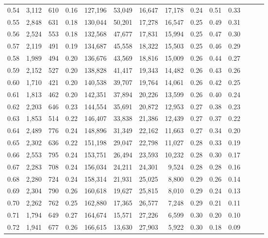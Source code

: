 \begin{tabular}{rrrrrrrrrrrrrr}
0.54 &  3,112 &  610 &  0.16 &  127,196 &   53,049 &  16,647 &  17,178 &  0.24 &  0.51 &      0.33 \\
0.55 &  2,848 &  631 &  0.18 &  130,044 &   50,201 &  17,278 &  16,547 &  0.25 &  0.49 &      0.31 \\
0.56 &  2,524 &  553 &  0.18 &  132,568 &   47,677 &  17,831 &  15,994 &  0.25 &  0.47 &      0.30 \\
0.57 &  2,119 &  491 &  0.19 &  134,687 &   45,558 &  18,322 &  15,503 &  0.25 &  0.46 &      0.29 \\
0.58 &  1,989 &  494 &  0.20 &  136,676 &   43,569 &  18,816 &  15,009 &  0.26 &  0.44 &      0.27 \\
0.59 &  2,152 &  527 &  0.20 &  138,828 &   41,417 &  19,343 &  14,482 &  0.26 &  0.43 &      0.26 \\
0.60 &  1,710 &  421 &  0.20 &  140,538 &   39,707 &  19,764 &  14,061 &  0.26 &  0.42 &      0.25 \\
0.61 &  1,813 &  462 &  0.20 &  142,351 &   37,894 &  20,226 &  13,599 &  0.26 &  0.40 &      0.24 \\
0.62 &  2,203 &  646 &  0.23 &  144,554 &   35,691 &  20,872 &  12,953 &  0.27 &  0.38 &      0.23 \\
0.63 &  1,853 &  514 &  0.22 &  146,407 &   33,838 &  21,386 &  12,439 &  0.27 &  0.37 &      0.22 \\
0.64 &  2,489 &  776 &  0.24 &  148,896 &   31,349 &  22,162 &  11,663 &  0.27 &  0.34 &      0.20 \\
0.65 &  2,302 &  636 &  0.22 &  151,198 &   29,047 &  22,798 &  11,027 &  0.28 &  0.33 &      0.19 \\
0.66 &  2,553 &  795 &  0.24 &  153,751 &   26,494 &  23,593 &  10,232 &  0.28 &  0.30 &      0.17 \\
0.67 &  2,283 &  708 &  0.24 &  156,034 &   24,211 &  24,301 &   9,524 &  0.28 &  0.28 &      0.16 \\
0.68 &  2,280 &  724 &  0.24 &  158,314 &   21,931 &  25,025 &   8,800 &  0.29 &  0.26 &      0.14 \\
0.69 &  2,304 &  790 &  0.26 &  160,618 &   19,627 &  25,815 &   8,010 &  0.29 &  0.24 &      0.13 \\
0.70 &  2,262 &  762 &  0.25 &  162,880 &   17,365 &  26,577 &   7,248 &  0.29 &  0.21 &      0.11 \\
0.71 &  1,794 &  649 &  0.27 &  164,674 &   15,571 &  27,226 &   6,599 &  0.30 &  0.20 &      0.10 \\
0.72 &  1,941 &  677 &  0.26 &  166,615 &   13,630 &  27,903 &   5,922 &  0.30 &  0.18 &      0.09 \\

\end{tabular}
